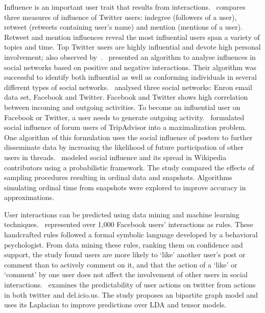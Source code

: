 \documentclass[letterpaper]{article}
\begin{document}
Influence is an important user trait that results from interactions.~\cite{cha2010measuring} compares three measures of influence of Twitter users: indegree (followers of a user), retweet (retweets containing user’s name) and mention (mentions of a user). Retweet and mention influences reveal the most influential users span a variety of topics and time. Top Twitter users are highly influential and devote high personal involvement; also observed by~\cite{asur2011trends}.~\cite{li2011casino} presented an algorithm to analyse influences in social networks based on positive and negative interactions. Their algorithm was successful to identify both influential as well as conforming individuals in several different types of social networks.~\cite{saez2011high} analysed three social networks: Enron email data set, Facebook and Twitter. Facebook and Twitter shows high correlation between incoming and outgoing activities. To become an influential user on Facebook or Twitter, a user needs to generate outgoing activity.~\cite{sun2011participation} formulated social influence of forum users of TripAdvisor into a maximalization problem. One algorithm of this formulation uses the social influence of posters to further disseminate data by increasing the likelihood of future participation of other users in threads.~\cite{cosley2010sequential} modeled social influence and its spread in Wikipedia contributors using a probabilistic framework. The study compared the effects of sampling procedures resulting in ordinal data and snapshots. Algorithms simulating ordinal time from snapshots were explored to improve accuracy in approximations.


User interactions can be predicted using data mining and machine learning techniques.~\cite{gomes2011social} represented over 1,000 Facebook users' interactions as rules. These handcrafted rules followed a formal symbolic language developed by a behavioral psychologist. From data mining these rules, ranking them on confidence and support, the study found users are more likely to `like' another user's post or comment than to actively comment on it, and that the action of a `like' or `comment' by one user does not affect the involvement of other users in social interactions.~\cite{nori2011exploiting} examines the predictability of user actions on twitter from actions in both twitter and del.icio.us. The study proposes an bipartite graph model and uses its Laplacian to improve predictions over LDA and tensor models.
\end{document}
